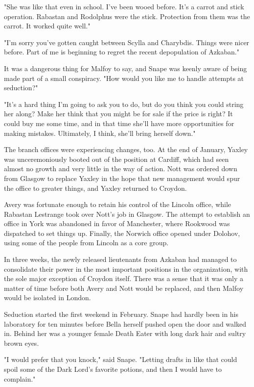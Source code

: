 \documentclass[a4paper,11pt]{article}
\begin{document}
"She was like that even in school. I've been wooed before. It's a carrot and stick operation. Rabastan and Rodolphus were the stick. Protection from them was the carrot. It worked quite well."

"I'm sorry you've gotten caught between Scylla and Charybdis. Things were nicer before. Part of me is beginning to regret the recent depopulation of Azkaban."

It was a dangerous thing for Malfoy to say, and Snape was keenly aware of being made part of a small conspiracy. "How would you like me to handle attempts at seduction?"

"It's a hard thing I'm going to ask you to do, but do you think you could string her along? Make her think that you might be for sale if the price is right? It could buy me some time, and in that time she'll have more opportunities for making mistakes. Ultimately, I think, she'll bring herself down."

The branch offices were experiencing changes, too. At the end of January, Yaxley was unceremoniously booted out of the position at Cardiff, which had seen almost no growth and very little in the way of action. Nott was ordered down from Glasgow to replace Yaxley in the hope that new management would spur the office to greater things, and Yaxley returned to Croydon.

Avery was fortunate enough to retain his control of the Lincoln office, while Rabastan Lestrange took over Nott's job in Glasgow. The attempt to establish an office in York was abandoned in favor of Manchester, where Rookwood was dispatched to set things up. Finally, the Norwich office opened under Dolohov, using some of the people from Lincoln as a core group.

In three weeks, the newly released lieutenants from Azkaban had managed to consolidate their power in the most important positions in the organization, with the sole major exception of Croydon itself. There was a sense that it was only a matter of time before both Avery and Nott would be replaced, and then Malfoy would be isolated in London.

Seduction started the first weekend in February. Snape had hardly been in his laboratory for ten minutes before Bella herself pushed open the door and walked in. Behind her was a younger female Death Eater with long dark hair and sultry brown eyes.

"I would prefer that you knock," said Snape. "Letting drafts in like that could spoil some of the Dark Lord's favorite potions, and then I would have to complain."
\end{document}
